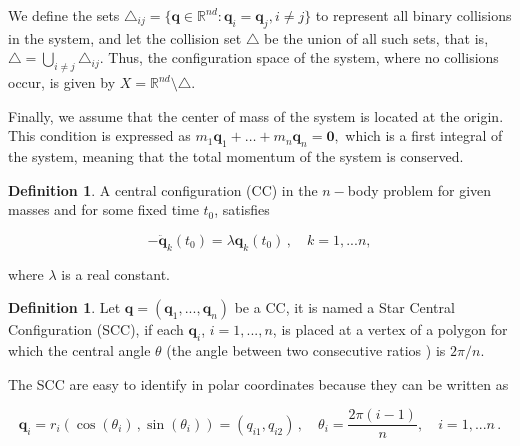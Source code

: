 \documentclass[final,11pt]{article}
\numberwithin{equation}{section}
\theoremstyle{definition}
\newtheorem{definition}[theorem]{Definition}
\begin{document}
We define the sets $ \triangle_{ij} = \{ \mathbf{q} \in \mathbb{R}^{nd} : \mathbf{q}_i = \mathbf{q}_j, i \neq j \} $ to represent all binary collisions in the system, and let the collision set $ \triangle $ be the union of all such sets, that is,
$
\triangle = \bigcup_{i \neq j} \triangle_{ij}.
$
Thus, the configuration space of the system, where no collisions occur, is given by
$
X = \mathbb{R}^{nd} \setminus \triangle.
$

Finally, we assume that the center of mass of the system is located at the origin. This condition is expressed as
$
m_1 \mathbf{q}_1 + \dots + m_n \mathbf{q}_n = \mathbf{0},
$
which is a first integral of the system, meaning that the total momentum of the system is conserved.

\begin{definition}\label{defII.1}
 A central configuration (CC) in the $n-$body problem for given masses and for some fixed time $t_0$, satisfies

\begin{equation}
-\ddot{\mathbf{q}}_k(t_0)=\lambda\mathbf{q}_k(t_0)\,, \quad k=1,...n,\label{cc}
\end{equation}

where $\lambda$ is a real constant.
\end{definition}    

\begin{definition}\label{ccpoligonalsemiregular}
Let $\mathbf{q}=(\mathbf{q}_1,...,\mathbf{q}_n)$ be a CC, it is named a Star Central Configuration (SCC), if each  $\mathbf{q}_i$, $i=1,...,n$, is placed at a vertex of a polygon for which the central angle $\theta$ (the angle between two consecutive ratios ) is $2\pi/n$.
\end{definition}
The SCC are easy to identify in polar coordinates because they can be written as

\begin{equation}
\mathbf{q}_i=r_i(\cos(\theta_i)\,,\sin(\theta_i))=(q_{i1},q_{i2})\,,  \quad \theta_i=\frac{2\pi (i-1)}{n}, \quad i=1,...n\,.\label{posicionesdeloscuerpos}
\end{equation}
\end{document}
